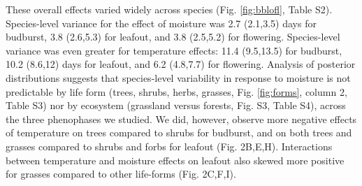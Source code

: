 \documentclass{article}
\begin{document}
\par These overall effects varied widely across species (Fig. \ref{fig:bblofl}, Table S2). Species-level variance for the effect of moisture was 2.7 (2.1,3.5) days for budburst, 3.8 (2.6,5.3) for leafout, and 3.8 (2.5,5.2) for flowering. Species-level variance was even greater for temperature effects: 11.4 (9.5,13.5) for budburst, 10.2 (8.6,12) days for leafout, and 6.2 (4.8,7.7) for flowering. 
Analysis of posterior distributions suggests that species-level variability in response to moisture is not predictable by life form (trees, shrubs, herbs, grasses, Fig. \ref{fig:forms}, column 2, Table S3)  nor by ecosystem (grassland versus forests, Fig. S3, Table S4), across the three phenophases we studied. We did, however, observe more negative effects of temperature on trees compared to shrubs for budburst, and on both trees and grasses compared to shrubs and forbs for leafout (Fig. 2B,E,H). Interactions between temperature and moisture effects on leafout also skewed more positive for grasses compared to other life-forms (Fig. 2C,F,I). 
\end{document}
